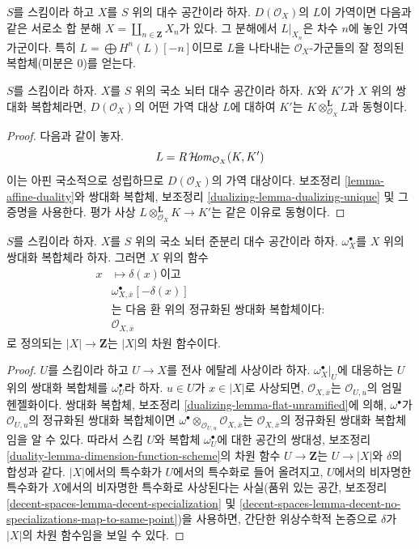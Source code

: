 \medskip\noindent
$S$를 스킴이라 하고 $X$를 $S$ 위의 대수 공간이라 하자.
$D(\mathcal{O}_X)$의 $L$이 가역이면 다음과 같은 서로소 합 분해
$X = \coprod_{n \in \mathbf{Z}} X_n$가 있다.
그 분해에서 $L|_{X_n}$은 차수 $n$에 놓인 가역 가군이다.
특히 $L = \bigoplus H^n(L)[-n]$이므로 $L$을 나타내는 $\mathcal{O}_X$-가군들의 잘 정의된
복합체(미분은 0)를 얻는다.

\begin{lemma}
\label{lemma-dualizing-unique-spaces}
$S$를 스킴이라 하자.
$X$를 $S$ 위의 국소 뇌터 대수 공간이라 하자.
$K$와 $K'$가 $X$ 위의 쌍대화 복합체라면,
$D(\mathcal{O}_X)$의 어떤 가역 대상 $L$에 대하여 $K'$는
$K \otimes_{\mathcal{O}_X}^\mathbf{L} L$과 동형이다.
\end{lemma}

\begin{proof}
다음과 같이 놓자.
$$
L = R\mathop{\mathcal{H}\!\mathit{om}}\nolimits_{\mathcal{O}_X}(K, K')
$$
이는 아핀 국소적으로 성립하므로 $D(\mathcal{O}_X)$의 가역 대상이다.
보조정리 \ref{lemma-affine-duality}와 쌍대화 복합체, 보조정리
\ref{dualizing-lemma-dualizing-unique} 및 그 증명을 사용한다.
평가 사상
$L \otimes_{\mathcal{O}_X}^\mathbf{L} K \to K'$는 같은 이유로 동형이다.
\end{proof}

\begin{lemma}
\label{lemma-dimension-function-scheme}
$S$를 스킴이라 하자. $X$를 $S$ 위의 국소 뇌터
준분리 대수 공간이라 하자.
$\omega_X^\bullet$를 $X$ 위의 쌍대화 복합체라 하자. 그러면 $X$ 위의
함수
$$
\begin{aligned}
x &\longmapsto \delta(x)\text{이고 } \\
&\omega_{X, \overline{x}}^\bullet[-\delta(x)] \\
&\text{는 다음 환 위의 정규화된 쌍대화 복합체이다:} \\
&\mathcal{O}_{X, \overline{x}}
\end{aligned}
$$
로 정의되는 $|X| \to \mathbf{Z}$는 $|X|$의 차원 함수이다.
\end{lemma}

\begin{proof}
$U$를 스킴이라 하고 $U \to X$를 전사 에탈레 사상이라 하자.
$\omega_X^\bullet|_U$에 대응하는 $U$ 위의 쌍대화 복합체를
$\omega_U^\bullet$라 하자.
$u \in U$가 $x \in |X|$로 사상되면,
$\mathcal{O}_{X, \overline{x}}$는 $\mathcal{O}_{U, u}$의
엄밀 헨젤화이다. 쌍대화 복합체, 보조정리
\ref{dualizing-lemma-flat-unramified}에 의해,
$\omega^\bullet$가 $\mathcal{O}_{U, u}$의 정규화된 쌍대화 복합체이면
$\omega^\bullet \otimes_{\mathcal{O}_{U, u}} \mathcal{O}_{X, \overline{x}}$는
$\mathcal{O}_{X, \overline{x}}$의 정규화된 쌍대화 복합체임을
알 수 있다.
따라서 스킴 $U$와 복합체 $\omega_U^\bullet$에 대한
공간의 쌍대성, 보조정리
\ref{duality-lemma-dimension-function-scheme}의 차원 함수
$U \to \mathbf{Z}$는 $U \to |X|$와 $\delta$의 합성과 같다.
$|X|$에서의 특수화가 $U$에서의 특수화로 들어 올려지고,
$U$에서의 비자명한 특수화가 $X$에서의 비자명한 특수화로 사상된다는
사실(품위 있는 공간, 보조정리
\ref{decent-spaces-lemma-decent-specialization} 및
\ref{decent-spaces-lemma-decent-no-specializations-map-to-same-point})을
사용하면, 간단한 위상수학적 논증으로 $\delta$가 $|X|$의 차원 함수임을
보일 수 있다.
\end{proof}
